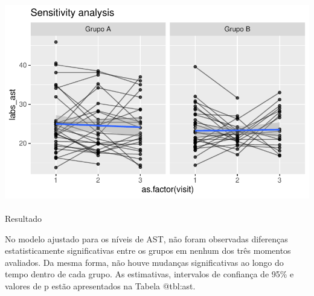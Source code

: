 \documentclass[
  letterpaper,
  DIV=11,
  numbers=noendperiod]{scrartcl}
\makeatletter
\let\oldparagraph\paragraph
\renewcommand{\paragraph}{
    \@ifstar
      \xxxParagraphStar
      \xxxParagraphNoStar
  }
\newcommand{\xxxParagraphStar}[1]{\oldparagraph*{#1}\mbox{}}
\newcommand{\xxxParagraphNoStar}[1]{\oldparagraph{#1}\mbox{}}
\makeatother
\begin{document}
\includegraphics{Outcomes_V1V2V3_files/figure-pdf/labs_ast_6-2.pdf}

\paragraph{Resultado}\label{resultado}

No modelo ajustado para os níveis de AST, não foram observadas
diferenças estatisticamente significativas entre os grupos em nenhum dos
três momentos avaliados. Da mesma forma, não houve mudanças
significativas ao longo do tempo dentro de cada grupo. As estimativas,
intervalos de confiança de 95\% e valores de p estão apresentados na
Tabela @tbl:ast.
\end{document}
